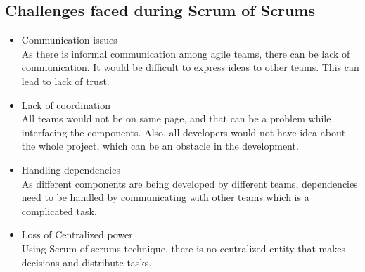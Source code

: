 \documentclass[sigconf]{acmart}
\begin{document}
\subsection{Challenges faced during Scrum of Scrums}
\begin{itemize}
\item Communication issues
\\As there is informal communication among agile teams, there can be lack of communication. It would be difficult to express ideas to other teams. This can lead to lack of trust.

\item Lack of coordination
\\All teams would not be on same page, and that can be a problem while interfacing the components. Also, all developers would not have idea about the whole project, which can be an obstacle in the development. 

\item Handling dependencies
\\As different components are being developed by different teams, dependencies need to be handled by communicating with other teams which is a complicated task. 

\item Loss of Centralized power
\\Using Scrum of scrums technique, there is no centralized entity that makes decisions and distribute tasks.
\end{itemize}
\end{document}
